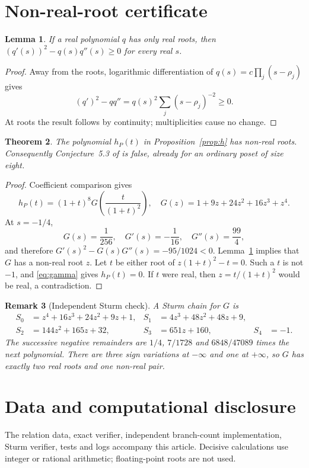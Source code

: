 \documentclass[11pt]{amsart}
\newtheorem{theorem}{Theorem}[section]\newtheorem{lemma}[theorem]{Lemma}
\newtheorem{remark}[theorem]{Remark}
\begin{document}
\section{Non-real-root certificate}
\begin{lemma}\label{lem:laguerre}
If a real polynomial $q$ has only real roots, then
$(q'(s))^2-q(s)q''(s)\ge0$ for every real $s$.
\end{lemma}
\begin{proof}
Away from the roots, logarithmic differentiation of
$q(s)=c\prod_j(s-\rho_j)$ gives
\[(q')^2-qq''=q(s)^2\sum_j(s-\rho_j)^{-2}\ge0.\]
At roots the result follows by continuity; multiplicities cause no change.
\end{proof}
\begin{theorem}\label{thm:main}
The polynomial $h_P(t)$ in Proposition~\ref{prop:h} has non-real roots.
Consequently Conjecture~5.3 of \cite{chapoton2026polytopesposetsassociatedpreorders} is false, already for an ordinary
poset of size eight.
\end{theorem}
\begin{proof}
Coefficient comparison gives
\begin{equation}\label{eq:gamma}
h_P(t)=(1+t)^8G\!\left(\frac{t}{(1+t)^2}\right),\quad
G(z)=1+9z+24z^2+16z^3+z^4.
\end{equation}
At $s=-1/4$,
\[G(s)=\frac1{256},\quad G'(s)=-\frac1{16},\quad G''(s)=\frac{99}{4},\]
and therefore $G'(s)^2-G(s)G''(s)=-95/1024<0$.
Lemma~\ref{lem:laguerre} implies that $G$ has a non-real root $z$. Let $t$
be either root of $z(1+t)^2-t=0$. Such a $t$ is not $-1$, and
\eqref{eq:gamma} gives $h_P(t)=0$. If $t$ were real, then
$z=t/(1+t)^2$ would be real, a contradiction.
\end{proof}
\begin{remark}[Independent Sturm check]
A Sturm chain for $G$ is
\[
\begin{aligned}
S_0&=z^4+16z^3+24z^2+9z+1,&S_1&=4z^3+48z^2+48z+9,\\
S_2&=144z^2+165z+32,&S_3&=651z+160,&S_4&=-1.
\end{aligned}
\]
The successive negative remainders are $1/4$, $7/1728$ and $6848/47089$
times the next polynomial. There are three sign variations at $-\infty$ and
one at $+\infty$, so $G$ has exactly two real roots and one non-real pair.
\end{remark}

\section*{Data and computational disclosure}
The relation data, exact verifier, independent branch-count implementation,
Sturm verifier, tests and logs accompany this article. Decisive calculations
use integer or rational arithmetic; floating-point roots are not used.

\end{document}
